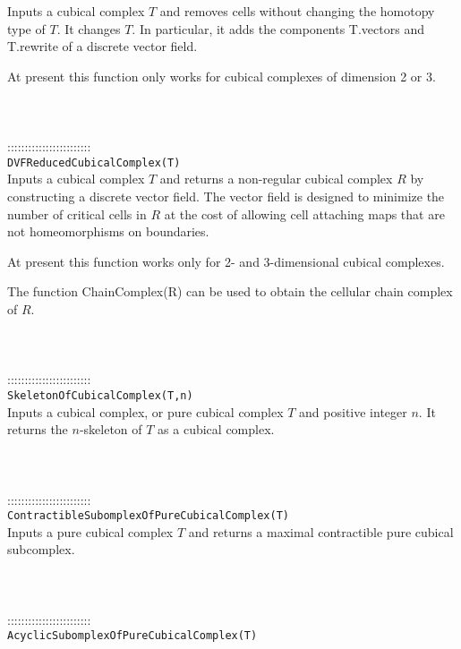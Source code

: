 \documentclass[a4paper,11pt]{report}
\begin{document}
{ Inputs a cubical complex $T$ and removes cells without changing the homotopy type of $T$. It changes $T$. In particular, it adds the components T.vectors and T.rewrite of a discrete
vector field. 

 At present this function only works for cubical complexes of dimension 2 or 3. \\
 \\
 \\
 \\
 ::::::::::::::::::::::::\\
 \texttt{DVFReducedCubicalComplex(T)}\\
 

 Inputs a cubical complex $T$ and returns a non-regular cubical complex $R$ by constructing a discrete vector field. The vector field is designed to
minimize the number of critical cells in $R$ at the cost of allowing cell attaching maps that are not homeomorphisms on
boundaries. 

 At present this function works only for 2- and 3-dimensional cubical
complexes. 

 The function ChainComplex(R) can be used to obtain the cellular chain complex
of $R$. \\
 \\
 \\
 \\
 ::::::::::::::::::::::::\\
 \texttt{SkeletonOfCubicalComplex(T,n)}\\
 

 Inputs a cubical complex, or pure cubical complex $T$ and positive integer $n$. It returns the $n$-skeleton of $T$ as a cubical complex. \\
 \\
 \\
 \\
 ::::::::::::::::::::::::\\
 \texttt{ContractibleSubomplexOfPureCubicalComplex(T)}\\
 

 Inputs a pure cubical complex $T$ and returns a maximal contractible pure cubical subcomplex. \\
 \\
 \\
 \\
 ::::::::::::::::::::::::\\
 \texttt{AcyclicSubomplexOfPureCubicalComplex(T)}\\
 

}
\end{document}
